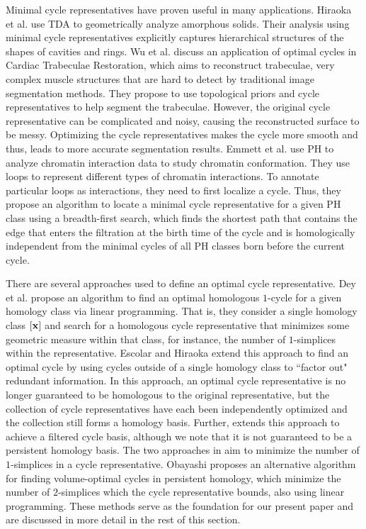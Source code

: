 Minimal cycle representatives have proven  useful in many applications. Hiraoka et al. \cite{Hiraoka7035} use TDA to geometrically analyze amorphous solids. Their analysis using minimal cycle representatives explicitly captures hierarchical structures of the shapes of cavities and rings. Wu et al. \cite{wu} discuss an application of optimal cycles in Cardiac Trabeculae Restoration, which aims to reconstruct trabeculae, very complex muscle structures that are hard to detect by traditional image segmentation methods. They propose to use topological priors and cycle representatives to help segment the trabeculae. However, the original cycle representative can be complicated and noisy, causing the reconstructed surface to be messy. Optimizing the cycle representatives makes the cycle more smooth and thus, leads to more accurate segmentation results. Emmett et al. \cite{emmett2015multiscale} use PH to analyze chromatin interaction data to study chromatin conformation. They use loops to represent different types of chromatin interactions. To annotate particular loops as interactions, they need to first localize a cycle. Thus, they propose an algorithm to locate a minimal cycle representative for a given PH class using a breadth-first search, which finds the shortest path that contains the edge that enters the filtration at the birth time of the cycle and is homologically independent from the minimal cycles of all PH classes born before the current cycle. 

 
There are several approaches used to define an optimal cycle representative. Dey et al. \cite{dey2011optimal} propose an algorithm to find an optimal homologous $1$-cycle for a given homology class via linear programming. That is, they consider a single homology class $[\mathbf{x}]$ and search for a homologous cycle representative that minimizes some geometric measure within that class, for instance, the number of $1$-simplices within the representative. Escolar and Hiraoka \cite{Escolar2016} extend this approach to find an optimal cycle by using cycles outside of a single homology class to ``factor out" redundant information. In this approach, an optimal cycle representative is no longer guaranteed to be homologous to the original representative, but the collection of cycle representatives have each been independently optimized and the collection still forms a homology basis. Further, \cite{Escolar2016} extends this approach to achieve a filtered cycle basis, although we note that it is not guaranteed to be a persistent homology basis. The two approaches in \cite{dey2011optimal,Escolar2016} aim to minimize the number of $1$-simplices in a cycle representative. Obayashi \cite{Obayashi2018} proposes an alternative algorithm for finding volume-optimal cycles in persistent homology, which minimize the number of $2$-simplices which the cycle representative bounds, also using linear programming. These methods serve as the foundation for our present paper and are discussed in more detail in the rest of this section.  


